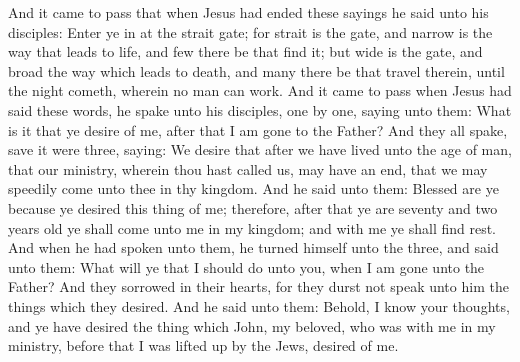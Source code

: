 And it came to pass that when Jesus had ended these sayings he said unto his disciples: Enter ye in at the strait gate; for strait is the gate, and narrow is the way that leads to life, and few there be that find it; but wide is the gate, and broad the way which leads to death, and many there be that travel therein, until the night cometh, wherein no man can work.
\bchapter
\bverse \iffalse And it came to pass when Jesus had said these words, he spake unto his disciples, one by one, saying unto them: What is it that ye desire of me, after that I am gone to the Father? \fi
And it came to pass when Jesus had said these words, he spake unto his disciples, one by one, saying unto them: What is it that ye desire of me, after that I am gone to the Father?
\bverse \iffalse And they all spake, save it were three, saying: We desire that after we have lived unto the age of man, that our ministry, wherein thou hast called us, may have an end, that we may speedily come unto thee in thy kingdom. \fi
And they all spake, save it were three, saying: We desire that after we have lived unto the age of man, that our ministry, wherein thou hast called us, may have an end, that we may speedily come unto thee in thy kingdom.
\bverse \iffalse And he said unto them: Blessed are ye because ye desired this thing of me; therefore, after that ye are seventy and two years old ye shall come unto me in my kingdom; and with me ye shall find rest. \fi
And he said unto them: Blessed are ye because ye desired this thing of me; therefore, after that ye are seventy and two years old ye shall come unto me in my kingdom; and with me ye shall find rest.
\bverse \iffalse And when he had spoken unto them, he turned himself unto the three, and said unto them: What will ye that I should do unto you, when I am gone unto the Father? \fi
And when he had spoken unto them, he turned himself unto the three, and said unto them: What will ye that I should do unto you, when I am gone unto the Father?
\bverse \iffalse And they sorrowed in their hearts, for they durst not speak unto him the things which they desired. \fi
And they sorrowed in their hearts, for they durst not speak unto him the things which they desired.
\bverse \iffalse And he said unto them: Behold, I know your thoughts, and ye have desired the thing which John, my beloved, who was with me in my ministry, before that I was lifted up by the Jews, desired of me. \fi
And he said unto them: Behold, I know your thoughts, and ye have desired the thing which John, my beloved, who was with me in my ministry, before that I was lifted up by the Jews, desired of me.
